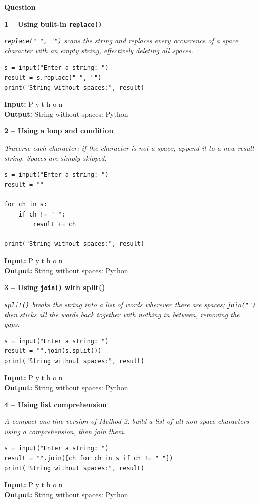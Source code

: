 \documentclass[12pt]{article}
\newenvironment{qbox}[1]{\par\bigskip\noindent\textbf{#1}\par}{\par\medskip}
\newcommand{\1}{Question}
\newcommand{\method}[1]{\par\medskip\noindent\textbf{#1}\par}
\newcommand{\logicbox}[1]{\par\smallskip\noindent\textit{#1}\par}
\newcommand{\inout}[2]{\par\smallskip\noindent\textbf{Input:} #1\\\textbf{Output:} #2\par}
\begin{document}
\begin{qbox}{\1}

\method{1 -- Using built-in \texttt{replace()}}
\logicbox{\texttt{replace(" ", "")} scans the string and replaces every occurrence of a space character with an empty string, effectively deleting all spaces.}
\begin{lstlisting}
s = input("Enter a string: ")
result = s.replace(" ", "")
print("String without spaces:", result)
\end{lstlisting}
\inout{P y t h o n}{String without spaces: Python}

\method{2 -- Using a loop and condition}
\logicbox{Traverse each character; if the character is not a space, append it to a new result string. Spaces are simply skipped.}
\begin{lstlisting}
s = input("Enter a string: ")
result = ""

for ch in s:
    if ch != " ":
        result += ch

print("String without spaces:", result)
\end{lstlisting}
\inout{P y t h o n}{String without spaces: Python}

\method{3 -- Using \texttt{join()} with split()}
\logicbox{\texttt{split()} breaks the string into a list of words wherever there are spaces; \texttt{join("")} then sticks all the words back together with nothing in between, removing the gaps.}
\begin{lstlisting}
s = input("Enter a string: ")
result = "".join(s.split())
print("String without spaces:", result)
\end{lstlisting}
\inout{P y t h o n}{String without spaces: Python}

\method{4 -- Using list comprehension}
\logicbox{A compact one-line version of Method 2: build a list of all non-space characters using a comprehension, then join them.}
\begin{lstlisting}
s = input("Enter a string: ")
result = "".join([ch for ch in s if ch != " "])
print("String without spaces:", result)
\end{lstlisting}
\inout{P y t h o n}{String without spaces: Python}
\end{qbox}
\end{document}
